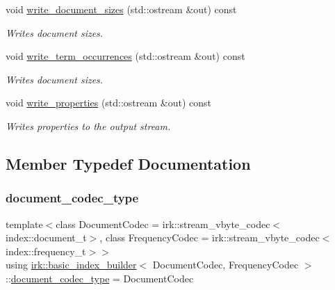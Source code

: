 \begin{DoxyCompactItemize}
void \mbox{\hyperlink{classirk_1_1basic__index__builder_a19f7a4ae586c56956966dbc1a854e105}{write\+\_\+document\+\_\+sizes}} (std\+::ostream \&out) const
\begin{DoxyCompactList}\small\item\em Writes document sizes. \end{DoxyCompactList}\item 
void \mbox{\hyperlink{classirk_1_1basic__index__builder_af432f500e307f241c961163e6388b050}{write\+\_\+term\+\_\+occurrences}} (std\+::ostream \&out) const
\begin{DoxyCompactList}\small\item\em Writes document sizes. \end{DoxyCompactList}\item 
void \mbox{\hyperlink{classirk_1_1basic__index__builder_ab5449278bf35ebae604a9caf12180657}{write\+\_\+properties}} (std\+::ostream \&out) const
\begin{DoxyCompactList}\small\item\em Writes properties to the output stream. \end{DoxyCompactList}\end{DoxyCompactItemize}


\subsection{Member Typedef Documentation}
\mbox{\label{classirk_1_1basic__index__builder_a8e4abd85a04c6a2801c66d2c6630841c}} 
\subsubsection{\texorpdfstring{document\+\_\+codec\+\_\+type}{document\_codec\_type}}
{\footnotesize\ttfamily template$<$class Document\+Codec  = irk\+::stream\+\_\+vbyte\+\_\+codec$<$index\+::document\+\_\+t$>$, class Frequency\+Codec  = irk\+::stream\+\_\+vbyte\+\_\+codec$<$index\+::frequency\+\_\+t$>$$>$ \\
using \mbox{\hyperlink{classirk_1_1basic__index__builder}{irk\+::basic\+\_\+index\+\_\+builder}}$<$ Document\+Codec, Frequency\+Codec $>$\+::\mbox{\hyperlink{classirk_1_1basic__index__builder_a8e4abd85a04c6a2801c66d2c6630841c}{document\+\_\+codec\+\_\+type}} =  Document\+Codec}

